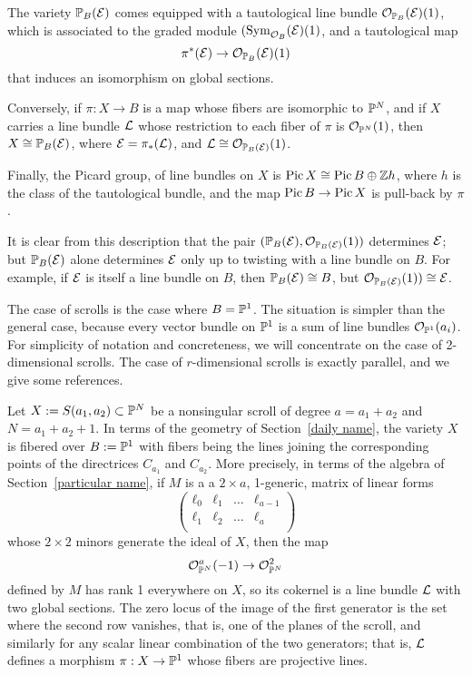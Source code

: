 The variety ${\mathbb P}_{B}({\mathcal E})$ comes equipped with a tautological line bundle ${\mathcal O}_{{\mathbb P}_{B}}({\mathcal E})(1)$, which is associated to the graded module $(\operatorname{Sym}_{{\mathcal O}_{B}} ({\mathcal E})(1)$, and a tautological map 
$$
\pi^{*}({\mathcal E}) \to {\mathcal O}_{{\mathbb P}_{B}}({\mathcal E})(1)
$$
that induces an isomorphism on global sections.

Conversely, if $\pi: X\to B$ is a map whose fibers are isomorphic to ${\mathbb P}^{N}$, and if $X$ carries a line bundle ${\mathcal L}$ whose restriction to each fiber of $\pi$ is ${\mathcal O}_{{\mathbb P}^{N}}(1)$, then $X\cong {\mathbb P}_{B}({\mathcal E})$,
where ${\mathcal E} = \pi_{*}({\mathcal L})$, and ${\mathcal L} \cong {\mathcal O}_{{\mathbb P}_{B}({\mathcal E})}(1)$.

Finally, the Picard group, of line bundles on $X$ is
$\operatorname{Pic} X \cong \operatorname{Pic} B \oplus {\mathbb Z} h$, where $h$ is the class of the tautological bundle, and
the map $\operatorname{Pic} B\to \operatorname{Pic} X$ is pull-back by $\pi$.

It is clear from this description that the pair $({\mathbb P}_{B}({\mathcal E}), {\mathcal O}_{{\mathbb P}_{B}({\mathcal E})}(1))$ determines ${\mathcal E}$; but 
${\mathbb P}_{B}({\mathcal E})$ alone determines ${\mathcal E}$ only up to twisting with a line bundle on $B$. For example, 
if ${\mathcal E}$ is itself a line bundle on $B$, then ${\mathbb P}_{B}({\mathcal E}) \cong  B$, but ${\mathcal O}_{{\mathbb P}_{B}({\mathcal E})}(1)) \cong {\mathcal E}$.

The case of scrolls is the case where $B ={\mathbb P}^{1}$. The situation is simpler than the general case, 
because every vector bundle
on ${\mathbb P}^{1}$ is a sum of line bundles ${\mathcal O}_{{\mathbb P}^{1}}(a_{i})$. For simplicity of notation and concreteness, we will concentrate on the case of 2-dimensional scrolls. The case of $r$-dimensional scrolls is exactly parallel, and we give some references. 
 
Let $X := S(a_{1}, a_{2})\subset {\mathbb P}^{N}$ be a nonsingular scroll of degree $a=a_{1}+a_{2}$ and $N = a_{1}+a_{2}+1$. In terms of the geometry of Section~\ref{daily name}, the variety $X$ is fibered over
$B:={\mathbb P}^{1}$ with fibers being the lines joining the corresponding points of the directrices $C_{a_{1}}$ and 
$C_{a_{2}}$. More precisely, in terms of the algebra of Section~\ref{particular name}, if $M$ is a
a $2\times a$, 1-generic, matrix of linear forms
$$
\begin{pmatrix}
 \ell_0&\ell_{1}&\dots &\ell_{a-1}\\
 \ell_1&\ell_{2}&\dots &\ell_{a}\\ 
\end{pmatrix}
$$
 whose $2\times 2$ minors generate the ideal of $X$,
then the map 
$$
{\mathcal O}_{{\mathbb P}^{N}}^{a}(-1)\to {\mathcal O}_{{\mathbb P}^{N}}^{2}
$$
 defined by $M$ has rank 1 everywhere
on $X$, so its cokernel is a line bundle ${\mathcal L}$ with two global sections. The zero locus
of the image of the first generator is the set where the second row vanishes, that is, 
one of the planes of the scroll, and similarly for any scalar linear combination of the
two generators; that is, ${\mathcal L}$ defines a morphism $\pi: X \to {\mathbb P}^{1}$ whose fibers are
projective lines.

